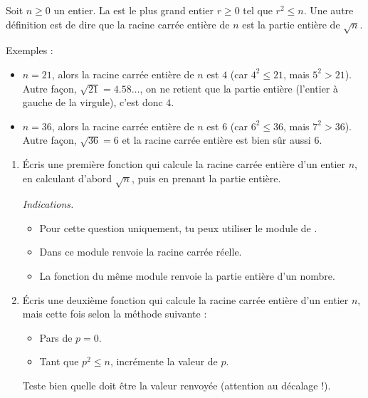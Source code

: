 \documentclass[11pt,class=report,crop=false]{standalone}
\begin{document}

\begin{activite}



Soit $n \ge 0$ un entier. 
La  est le plus grand entier $r\ge0$ tel que $r^2 \le  n$. 
Une autre définition est de dire que la racine carrée entière de $n$ est la partie entière de $\sqrt{n}$.

Exemples :
\begin{itemize}
  \item $n=21$, alors la racine carrée entière de $n$ est $4$ (car $4^2 \le 21$, mais $5^2 > 21$). Autre façon, $\sqrt{21} = 4.58\ldots$, on ne retient que la partie entière (l'entier à gauche de la virgule), c'est donc $4$.
  
  \item $n=36$, alors la racine carrée entière de $n$ est $6$ (car $6^2 \le 36$, mais $7^2 > 36$). Autre façon, $\sqrt{36} = 6$ et la racine carrée entière est bien sûr aussi $6$.    
\end{itemize}

\begin{enumerate}
  \item Écris une première fonction qui calcule la racine carrée entière d'un entier $n$, en calculant d'abord $\sqrt{n}$, puis en prenant la partie entière.
  
  \emph{Indications.}
  \begin{itemize}
    \item Pour cette question uniquement, tu peux utiliser le module  de \Python. 
    \item Dans ce module  renvoie la racine carrée réelle.
    \item La fonction  du même module renvoie la partie entière d'un nombre.
  \end{itemize}
  
  \item Écris une deuxième fonction qui calcule la racine carrée entière d'un entier $n$, mais cette fois selon la méthode suivante :
  \begin{itemize}
    \item Pars de $p=0$.
    \item Tant que $p^2 \le n$, incrémente la valeur de $p$.
  \end{itemize}
  Teste bien quelle doit être la valeur renvoyée (attention au décalage !).
  

\end{enumerate}
\end{activite}
\end{document}
